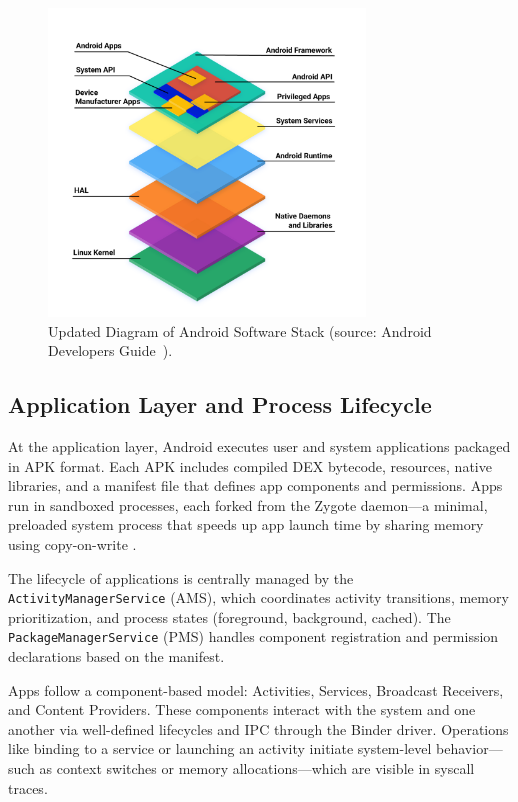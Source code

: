 \documentclass[a4paper,12pt]{report}
\begin{document}
\begin{figure}[H]
    \centering
    \includegraphics[width=0.75\textwidth]{android_stack_diagram.png}
    \caption{Updated Diagram of Android Software Stack (source: Android Developers Guide~\cite{AOSPArchOverview}).}
    \label{fig:android_stack}
\end{figure}

\subsection{Application Layer and Process Lifecycle}
At the application layer, Android executes user and system applications packaged in APK format. Each APK includes compiled DEX bytecode, resources, native libraries, and a manifest file that defines app components and permissions. Apps run in sandboxed processes, each forked from the Zygote daemon—a minimal, preloaded system process that speeds up app launch time by sharing memory using copy-on-write \cite{AOSPArchOverview}.

The lifecycle of applications is centrally managed by the \texttt{ActivityManagerService} (AMS), which coordinates activity transitions, memory prioritization, and process states (foreground, background, cached). The \texttt{PackageManagerService} (PMS) handles component registration and permission declarations based on the manifest.

Apps follow a component-based model: Activities, Services, Broadcast Receivers, and Content Providers. These components interact with the system and one another via well-defined lifecycles and IPC through the Binder driver. Operations like binding to a service or launching an activity initiate system-level behavior—such as context switches or memory allocations—which are visible in syscall traces.
\end{document}
